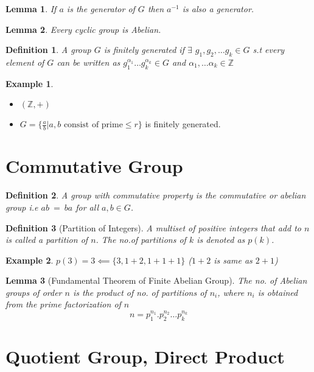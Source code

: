 \documentclass[12pt,a4paper]{article}
\newcommand{\Z}{\mathbb{Z}}
\newtheorem*{defn}{Definition}
\newtheorem*{lem}{Lemma}
\newtheorem{ex}{Example}
\begin{document}
\begin{lem}\normalfont
	If $a$ is the generator of $G$ then $a^{-1}$ is also a generator.
\end{lem}
\begin{lem}\normalfont
	Every cyclic group is Abelian.
\end{lem}
\begin{defn}\normalfont
	A group $G$ is finitely generated if $\exists$ $g_{1},g_{2},\dots g_{k}\in G$ s.t every element of $G$ can be written as $g_{1}^{{\alpha}_{1}} \dots g_{k}^{{\alpha}_{k}} \in G  $ and $\alpha_{1}, \dots \alpha_{k} \in \Z$
\end{defn}
\begin{ex}
\end{ex}	
\begin{itemize}
	\item $(\Z, +)$
	\item $G = \{\frac{a}{b} | a,b \text{ consist of prime} \le r\}$ is finitely generated.
\end{itemize}






\section{Commutative Group}

\begin{defn}\normalfont
	A group with commutative property is the \textit{commutative or abelian} group i.e $ab\:=\:ba$ for all $a,b\in G$.
\end{defn}
\begin{defn}[Partition of Integers]\normalfont
	A multiset of positive integers that add to $n$ is called a partition of $n$. The no.of partitions of $k$ is denoted as $p(k)$.
\end{defn}
\begin{ex}
	$p(3) = 3 \impliedby \{3,1+2,1+1+1\}$ ($1+2$ is same as $2+1$)
\end{ex}
\begin{lem}[Fundamental Theorem of Finite Abelian Group]\normalfont
	The no. of Abelian groups of order $n$ is the product of no. of partitions of $n_{i}$, where $n_{i}$ is obtained from the prime factorization of $n$ 
	$$
		n = p_{1}^{{n}_{1}}. p_{2}^{{n}_{2}}\dots p_{k}^{{n}_{k}}
	$$
\end{lem}

\section{Quotient Group, Direct Product}
\end{document}
